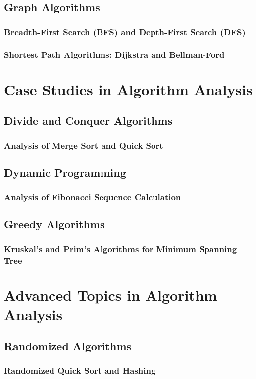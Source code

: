 \documentclass[12pt]{book} %
\begin{document}
\subsection{Graph Algorithms}
\subsubsection{Breadth-First Search (BFS) and Depth-First Search (DFS)}
\subsubsection{Shortest Path Algorithms: Dijkstra and Bellman-Ford}

\section{Case Studies in Algorithm Analysis}
\subsection{Divide and Conquer Algorithms}
\subsubsection{Analysis of Merge Sort and Quick Sort}
\subsection{Dynamic Programming}
\subsubsection{Analysis of Fibonacci Sequence Calculation}
\subsection{Greedy Algorithms}
\subsubsection{Kruskal's and Prim's Algorithms for Minimum Spanning Tree}

\section{Advanced Topics in Algorithm Analysis}
\subsection{Randomized Algorithms}
\subsubsection{Randomized Quick Sort and Hashing}
\end{document}
